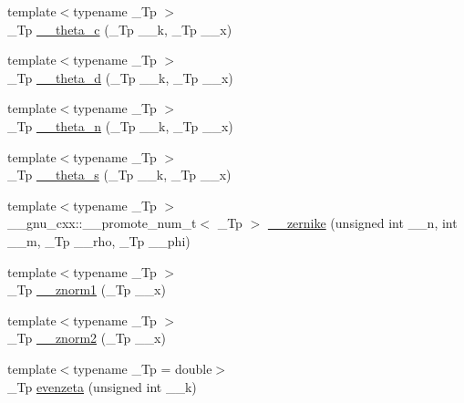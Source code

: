 \begin{DoxyCompactItemize}
\item 
{\footnotesize template$<$typename \+\_\+\+Tp $>$ }\\\+\_\+\+Tp \hyperlink{namespacestd_1_1____detail_af95cdf16bfcf6c138d621b0c518a3299}{\+\_\+\+\_\+theta\+\_\+c} (\+\_\+\+Tp \+\_\+\+\_\+k, \+\_\+\+Tp \+\_\+\+\_\+x)
\item 
{\footnotesize template$<$typename \+\_\+\+Tp $>$ }\\\+\_\+\+Tp \hyperlink{namespacestd_1_1____detail_ad4ca29063a2f624e185592497d37a670}{\+\_\+\+\_\+theta\+\_\+d} (\+\_\+\+Tp \+\_\+\+\_\+k, \+\_\+\+Tp \+\_\+\+\_\+x)
\item 
{\footnotesize template$<$typename \+\_\+\+Tp $>$ }\\\+\_\+\+Tp \hyperlink{namespacestd_1_1____detail_aace76210c8f70761bb14ab602b88d027}{\+\_\+\+\_\+theta\+\_\+n} (\+\_\+\+Tp \+\_\+\+\_\+k, \+\_\+\+Tp \+\_\+\+\_\+x)
\item 
{\footnotesize template$<$typename \+\_\+\+Tp $>$ }\\\+\_\+\+Tp \hyperlink{namespacestd_1_1____detail_aeac5da2d394fafe6432871abf5c05413}{\+\_\+\+\_\+theta\+\_\+s} (\+\_\+\+Tp \+\_\+\+\_\+k, \+\_\+\+Tp \+\_\+\+\_\+x)
\item 
{\footnotesize template$<$typename \+\_\+\+Tp $>$ }\\\+\_\+\+\_\+gnu\+\_\+cxx\+::\+\_\+\+\_\+promote\+\_\+num\+\_\+t$<$ \+\_\+\+Tp $>$ \hyperlink{namespacestd_1_1____detail_aa7d33201bdf73b58250d6a7ede44e896}{\+\_\+\+\_\+zernike} (unsigned int \+\_\+\+\_\+n, int \+\_\+\+\_\+m, \+\_\+\+Tp \+\_\+\+\_\+rho, \+\_\+\+Tp \+\_\+\+\_\+phi)
\item 
{\footnotesize template$<$typename \+\_\+\+Tp $>$ }\\\+\_\+\+Tp \hyperlink{namespacestd_1_1____detail_a6827b123253cc6a19947406339738bd7}{\+\_\+\+\_\+znorm1} (\+\_\+\+Tp \+\_\+\+\_\+x)
\item 
{\footnotesize template$<$typename \+\_\+\+Tp $>$ }\\\+\_\+\+Tp \hyperlink{namespacestd_1_1____detail_adf930b70ca943c6810ac7d2ea78d2cc3}{\+\_\+\+\_\+znorm2} (\+\_\+\+Tp \+\_\+\+\_\+x)
\item 
{\footnotesize template$<$typename \+\_\+\+Tp  = double$>$ }\\\+\_\+\+Tp \hyperlink{namespacestd_1_1____detail_af59bd2be508cc6a421ddf5dd70c93d97}{evenzeta} (unsigned int \+\_\+\+\_\+k)
\end{DoxyCompactItemize}
